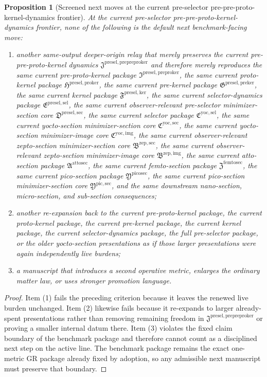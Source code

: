 \documentclass[11pt]{article}
\newcommand{\PrePreProtoKernelPackage}{\mathfrak J^{\mathrm{presel,prepreproker}}}
\newcommand{\PreProtoKernelPackage}{\mathfrak I^{\mathrm{presel,preproker}}}
\newcommand{\ProtoKernelPackage}{\mathfrak H^{\mathrm{presel,proker}}}
\newcommand{\PreKernelPackage}{\mathfrak G^{\mathrm{presel,preker}}}
\newcommand{\KernelPackage}{\mathfrak F^{\mathrm{presel,ker}}}
\newcommand{\PreSectionSelectorPackage}{\mathfrak E^{\mathrm{presel,sel}}}
\newcommand{\PreSelectorMinSectionCore}{\mathfrak D^{\mathrm{presel,sec}}}
\newcommand{\YoctoSelectorPackage}{\mathfrak C^{\mathrm{yoc,sel}}}
\newcommand{\YoctoImageCore}{\mathfrak C^{\mathrm{yoc,img}}}
\newcommand{\YoctoMinSectionCore}{\mathfrak C^{\mathrm{yoc,sec}}}
\newcommand{\ZeptoImageCore}{\mathfrak B^{\mathrm{zep,img}}}
\newcommand{\ZeptoMinSectionCore}{\mathfrak B^{\mathrm{zep,sec}}}
\newcommand{\AttoSectionPackage}{\mathfrak A^{\mathrm{attosec}}}
\newcommand{\FemtoSectionPackage}{\mathfrak Z^{\mathrm{femtosec}}}
\newcommand{\PicoSectionPackage}{\mathfrak Y^{\mathrm{picosec}}}
\newcommand{\PicoMinSectionCore}{\mathfrak Y^{\mathrm{pic,sec}}}
\newtheorem{proposition}{Proposition}
\begin{document}
\begin{proposition}[Screened next moves at the current pre-selector pre-pre-proto-kernel-dynamics frontier]
At the current pre-selector pre-pre-proto-kernel-dynamics frontier, none of the following is the default next benchmark-facing move:
\begin{enumerate}
    \item another same-output deeper-origin relay that merely preserves the current pre-pre-proto-kernel dynamics \(\PrePreProtoKernelPackage\) and therefore merely reproduces the same current pre-proto-kernel package \(\PreProtoKernelPackage\), the same current proto-kernel package \(\ProtoKernelPackage\), the same current pre-kernel package \(\PreKernelPackage\), the same current kernel package \(\KernelPackage\), the same current selector-dynamics package \(\PreSectionSelectorPackage\), the same current observer-relevant pre-selector minimizer-section core \(\PreSelectorMinSectionCore\), the same current selector package \(\YoctoSelectorPackage\), the same current yocto-section minimizer-section core \(\YoctoMinSectionCore\), the same current yocto-section minimizer-image core \(\YoctoImageCore\), the same current observer-relevant zepto-section minimizer-section core \(\ZeptoMinSectionCore\), the same current observer-relevant zepto-section minimizer-image core \(\ZeptoImageCore\), the same current atto-section package \(\AttoSectionPackage\), the same current femto-section package \(\FemtoSectionPackage\), the same current pico-section package \(\PicoSectionPackage\), the same current pico-section minimizer-section core \(\PicoMinSectionCore\), and the same downstream nano-section, micro-section, and sub-section consequences;
    \item another re-expansion back to the current pre-proto-kernel package, the current proto-kernel package, the current pre-kernel package, the current kernel package, the current selector-dynamics package, the full pre-selector package, or the older yocto-section presentations as if those larger presentations were again independently live burdens;
    \item a manuscript that introduces a second operative metric, enlarges the ordinary matter law, or uses stronger promotion language.
\end{enumerate}
\end{proposition}

\begin{proof}
Item (1) fails the preceding criterion because it leaves the renewed live burden unchanged. Item (2) likewise fails because it re-expands to larger already-spent presentations rather than removing remaining freedom in \(\PrePreProtoKernelPackage\) or proving a smaller internal datum there. Item (3) violates the fixed claim boundary of the benchmark package and therefore cannot count as a disciplined next step on the active line. The benchmark package remains the exact one-metric GR package already fixed by adoption, so any admissible next manuscript must preserve that boundary.
\end{proof}
\end{document}
